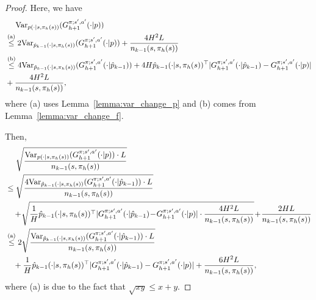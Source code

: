 \begin{proof}
	
	Here, we have
	\begin{align*}
		&\quad\ \var_{p(\cdot|s,\pi_h(s))}(G^{\pi;s',a'}_{h+1}(\cdot|p)) \\
		&\overset{\textup{(a)}}{\leq} 2 \var_{\hat{p}_{k-1}(\cdot|s,\pi_h(s))}(G^{\pi;s',a'}_{h+1}(\cdot|p)) + \frac{4H^2L}{n_{k-1}(s,\pi_h(s))}
		\\
		&\overset{\textup{(b)}}{\leq} 4 \var_{\hat{p}_{k-1}(\cdot|s,\pi_h(s))}(G^{\pi;s',a'}_{h+1}(\cdot|\hat{p}_{k-1}))+ 4H \hat{p}_{k-1}(\cdot|s,\pi_h(s))^\top |G^{\pi;s',a'}_{h+1}(\cdot|\hat{p}_{k-1}) - G^{\pi;s',a'}_{h+1}(\cdot|p) | \\& + \frac{4H^2L}{n_{k-1}(s,\pi_h(s))} ,
	\end{align*}
	where (a) uses Lemma~\ref{lemma:var_change_p} and (b) comes from Lemma~\ref{lemma:var_change_f}.
	
	Then,
	\begin{align}
		&\quad\ \sqrt{\frac{\var_{p(\cdot|s,\pi_h(s))}(G^{\pi;s',a'}_{h+1}(\cdot|p)) \cdot L}{n_{k-1}(s,\pi_h(s))}}
		\\
		&\leq \sqrt{\frac{4 \var_{\hat{p}_{k-1}(\cdot|s,\pi_h(s))}(G^{\pi;s',a'}_{h+1}(\cdot|\hat{p}_{k-1})) \cdot L}{{n_{k-1}(s,\pi_h(s))}}} 
		\nonumber\\&\quad +\! \sqrt{\frac{1}{H} \hat{p}_{k-1}(\cdot|s,\pi_h(s))^\top |G^{\pi;s',a'}_{h+1}(\cdot|\hat{p}_{k-1}) \!-\! G^{\pi;s',a'}_{h+1}(\cdot|p) | \cdot  \frac{4H^2L}{{n_{k-1}(s,\pi_h(s))}}} \!+\! \frac{2HL}{n_{k-1}(s,\pi_h(s))}
		\nonumber\\
		&\overset{\textup{(a)}}{\leq} 2\sqrt{\frac{ \var_{\hat{p}_{k-1}(\cdot|s,\pi_h(s))}(G^{\pi;s',a'}_{h+1}(\cdot|\hat{p}_{k-1})) \cdot L}{{n_{k-1}(s,\pi_h(s))}}} 
		\nonumber\\&\quad + \frac{1}{H} \hat{p}_{k-1}(\cdot|s,\pi_h(s))^\top |G^{\pi;s',a'}_{h+1}(\cdot|\hat{p}_{k-1}) - G^{\pi;s',a'}_{h+1}(\cdot|p) |  + \frac{6H^2L}{n_{k-1}(s,\pi_h(s))} , \label{eq:var_G_p}
	\end{align}
	where (a) is due to the fact that $\sqrt{xy} \leq x+y$.
	

\end{proof}
